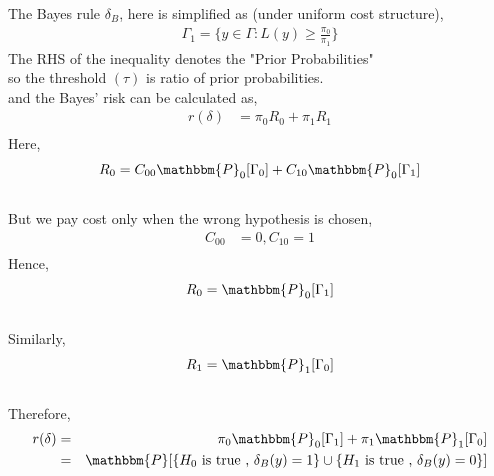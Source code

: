 \documentclass[12pt]{report}
\begin{document}
\begin{itemize}
The Bayes rule $\delta_B$, here is simplified as (under uniform cost structure),
\begin{align*}
\Gamma_1 =\{y \in \Gamma : L(y) \geq \frac {\pi_0}{\pi_1}\}
\end{align*}
The RHS of the inequality denotes the "Prior Probabilities"\\
so the threshold $(\tau)$ is ratio of prior probabilities.\\
and the Bayes' risk can be calculated as,
\begin{eqnarray}
\nonumber
r(\delta)&= \pi_0 R_0 + \pi_1 R_1 \\
\nonumber
\end{eqnarray}
Here,
\begin{eqnarray}
 R_0 &= C_{00}  \mathbbm{P}_0[\Gamma_0]+C_{10}  \mathbbm{P}_0[\Gamma_1]\\
\nonumber
\end{eqnarray}
But we pay cost only when the wrong hypothesis is chosen, 
\begin{eqnarray}
\nonumber
C_{00}&=0,C_{10}=1\\
\nonumber
\end{eqnarray}
Hence, 
\begin{eqnarray}
\nonumber
R_0&=  \mathbbm{P}_0[\Gamma_1]\\
\nonumber
\end{eqnarray}
Similarly,
\begin{eqnarray}
\nonumber
R_1&=  \mathbbm{P}_1[\Gamma_0]\\
\nonumber
\end{eqnarray}
Therefore,
\begin{eqnarray}
\nonumber
r(\delta)&=& \pi_0  \mathbbm{P}_0[\Gamma_1]+\pi_1  \mathbbm{P}_1[\Gamma_0]\\
&=&\mathbbm{P}[\{H_0 \text{ is true , }  \delta_B(y) = 1\}  \cup \{H_1  \text{ is true , } \delta_B(y) = 0\}]
\nonumber
\end{eqnarray}



\end{itemize}
\end{document}
